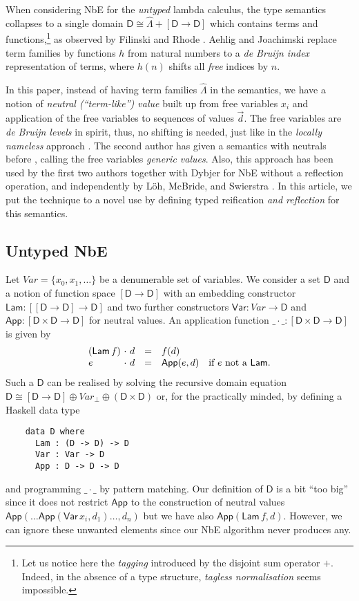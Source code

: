 \documentclass{LMCS}
\theoremstyle{plain}\newtheorem{satz}[thm]{Satz}
\newcommand{\Lam}{\mathsf{Lam}}
\newcommand{\App}{\mathsf{App}}
\newcommand{\D}{\mathsf{D}}
\newcommand{\Var}{\mathit{Var}}
\newcommand{\iVar}[1]{\mathsf{Var}\,x_{#1}}
\begin{document}
When considering NbE for the \emph{untyped} lambda calculus, the type
semantics collapses to a single domain $\D \cong \widehat\Lambda +
[\D \to \D]$ which contains terms and functions,\footnote{
Let us notice
here the \emph{tagging} introduced by the disjoint sum operator $+$.
Indeed, in the absence of a type structure, \emph{tagless
  normalisation} seems impossible.  
}
as observed by Filinski and Rhode \cite{filinskiRohde:untypedNbE}.  
Aehlig and Joachimski \cite{aehlig:nbe} replace term families by
functions $h$ from natural numbers to a \emph{de Bruijn index}
representation of terms, where $h(n)$ shifts all \emph{free} indices
by $n$. 

In this paper, instead of having term families $\widehat\Lambda$ in
the semantics, we have a notion of \emph{neutral (``term-like'')
  value} built up from free variables $x_i$ and application of the
free variables to sequences of values $\vec d$.  The free variables
are \emph{de Bruijn levels} in spirit, thus, no shifting is needed,
just like in the \emph{locally nameless} approach
\cite{pollack:alpha}.  The second author has given a semantics with
neutrals before \cite{coquand:type}, calling the free variables
\emph{generic values}.  Also, this approach has been used by the first
two authors together with Dybjer \cite{abelCoquandDybjer:mpc08} for
NbE without a reflection operation, and independently by L\"oh,
McBride, and Swierstra
\cite{loehMcBrideSwierstra:tutorialDependentlyLambda}.  In this
article, we put the technique to a novel use by defining typed
reification \emph{and reflection} for this semantics.


\subsection{Untyped NbE}
\label{sec:untyped-nbe}
Let $\Var = \{x_0, x_1, \dots\}$ be a denumerable set of variables.
We consider a set $\D$ and a notion of function space $[\D \to \D]$
with an embedding constructor $\Lam : [[\D \to \D] \to \D]$ and two
further constructors $\mathsf{Var} : \Var \to \D$ and $\App : [\D \times \D \to
\D]$ for neutral values.  An application function $\_\cdot\_ : [\D
\times \D \to \D]$ is given by
\[
\begin{array}{l@{~}l@{~}lll@{\quad}l}
  (\Lam\,f) & \cdot & d & = & f(d) \\
  e         & \cdot & d & = & \App(e,d) & \mbox{if } e \mbox{ not a }
    \Lam .\\ 
\end{array}
\]
Such a $\D$ can be realised by solving the recursive domain equation 
$\D \cong [\D \to \D] \oplus \Var_{\bot}  \oplus (\D \times \D)$ or, for
the practically minded, by defining a Haskell data type
\begin{verbatim}
    data D where
      Lam : (D -> D) -> D
      Var : Var -> D
      App : D -> D -> D
\end{verbatim}
and programming $\_\cdot\_$ by pattern matching.  Our definition of
$\D$ is a bit ``too big'' since it does not restrict $\App$ to the
construction of neutral values
$\App(\dots\App(\iVar i,d_1)\dots,d_n)$ but we have also
$\App(\Lam\,f,d)$.  However, we can ignore these unwanted elements
since our NbE algorithm never produces any. 
\end{document}
